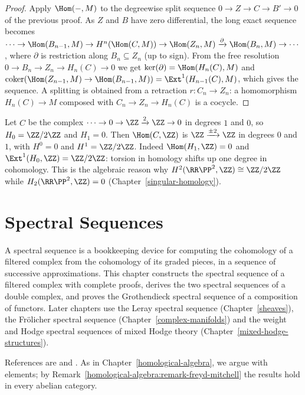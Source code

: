 \begin{proof}
Apply $\Hom(-, M)$ to the degreewise split sequence $0 \to Z \to C \to B' \to 0$ of the previous proof. As $Z$ and $B$ have zero
differential, the long exact sequence becomes
$\cdots \to \Hom(B_{n-1}, M) \to H^n(\Hom(C, M)) \to \Hom(Z_n, M) \xrightarrow{\partial} \Hom(B_n, M) \to \cdots$, where $\partial$ is restriction
along $B_n \subseteq Z_n$ (up to sign). From the free resolution $0 \to B_n \to Z_n \to H_n(C) \to 0$ we get
$\ker(\partial) = \Hom(H_n(C), M)$ and $\operatorname{coker}(\Hom(Z_{n-1}, M) \to \Hom(B_{n-1}, M)) = \Ext^1(H_{n-1}(C), M)$, which gives the
sequence. A splitting is obtained from a retraction $r \colon C_n \to Z_n$: a homomorphism $H_n(C) \to M$ composed with
$C_n \to Z_n \to H_n(C)$ is a cocycle.
\end{proof}

\begin{example}\label{homological-algebra:example-uct}
Let $C$ be the complex $\cdots \to 0 \to \ZZ \xrightarrow{2} \ZZ \to 0$ in degrees $1$ and $0$, so $H_0 = \ZZ/2\ZZ$ and $H_1 = 0$. Then
$\Hom(C, \ZZ)$ is $\ZZ \xrightarrow{\pm 2} \ZZ$ in degrees $0$ and $1$, with $H^0 = 0$ and $H^1 = \ZZ/2\ZZ$. Indeed
$\Hom(H_1, \ZZ) = 0$ and $\Ext^1(H_0, \ZZ) = \ZZ/2\ZZ$: torsion in homology shifts up one degree in cohomology. This is the
algebraic reason why $H^2(\RR\PP^2, \ZZ) \cong \ZZ/2\ZZ$ while $H_2(\RR\PP^2, \ZZ) = 0$ (Chapter~\ref{singular-homology}).
\end{example}

\section{Spectral Sequences}\label{homological-algebra:section-spectral-sequences}
A spectral sequence is a bookkeeping device for computing the cohomology of a filtered complex from the
cohomology of its graded pieces, in a sequence of successive approximations. This chapter constructs the
spectral sequence of a filtered complex with complete proofs, derives the two spectral sequences of a double
complex, and proves the Grothendieck spectral sequence of a composition of functors. Later chapters use the
Leray spectral sequence (Chapter~\ref{sheaves}), the Fr\"olicher spectral sequence
(Chapter~\ref{complex-manifolds}) and the weight and Hodge spectral sequences of mixed Hodge theory
(Chapter~\ref{mixed-hodge-structures}).

References are \cite[Chapter 5]{weibel-homological} and \cite{mccleary-users-guide}. As in
Chapter~\ref{homological-algebra}, we argue with elements; by
Remark~\ref{homological-algebra:remark-freyd-mitchell} the results hold in every abelian category.

